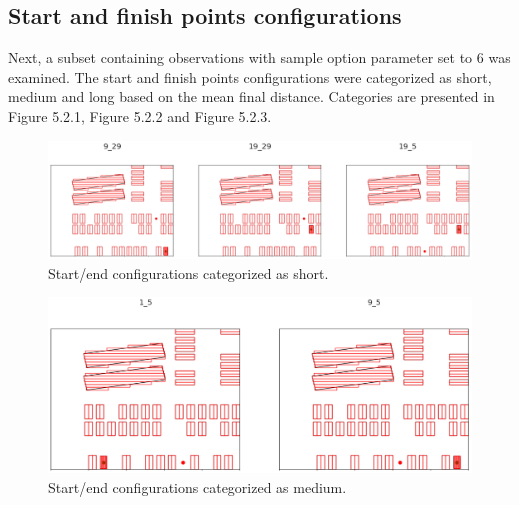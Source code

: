 \documentclass[a4paper,12pt]{article}
\DeclareRobustCommand{\[}{\begin{equation}}
\DeclareRobustCommand{\]}{\end{equation}}
\numberwithin{equation}{section}
\numberwithin{algorithm}{section}
\begin{document}
\subsection{Start and finish points configurations}
Next, a subset containing observations with sample option parameter set to 6 was examined. The start and finish points configurations were categorized as short, medium and long based on the mean final distance. Categories are presented in Figure 5.2.1, Figure 5.2.2 and Figure 5.2.3.
\begin{figure}[H]
\begin{center}
\includegraphics[scale=0.4]{images/shorts.png}
\captionsetup{width=0.6\textwidth}
\caption{Start/end configurations categorized as short.}
\end{center}
\end{figure}
\begin{figure}[H]
\begin{center}
\includegraphics[scale=0.4]{images/mediums.png}
\captionsetup{width=0.6\textwidth}
\caption{Start/end configurations categorized as medium.}
\end{center}
\end{figure}
\end{document}
